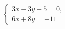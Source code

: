 \begin{ex}
	\begin{condition}
		\( \left\{
		\begin{array}{l}
			3x-3y-5=0,\\
			6x+8y=-11
		\end{array}
		\right. \)
	\end{condition}
\end{ex}
